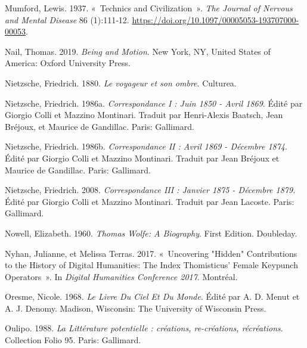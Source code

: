 \begin{CSLReferences}{1}{0}
\leavevmode{}%
Mumford, Lewis. 1937. {«~Technics and {Civilization}~»}. \emph{The
Journal of Nervous and Mental Disease} 86 (1):111‑12.
\url{https://doi.org/10.1097/00005053-193707000-00053}.

\leavevmode{}%
Nail, Thomas. 2019. \emph{Being and {Motion}}. {New York, NY, United
States of America}: {Oxford University Press}.

\leavevmode{}%
Nietzsche, Friedrich. 1880. \emph{{Le voyageur et son ombre}}.
{Culturea}.

\leavevmode{}%
Nietzsche, Friedrich. 1986a. \emph{{Correspondance I : Juin 1850 - Avril
1869}}. Édité par Giorgio Colli et Mazzino Montinari. Traduit par
Henri-Alexis Baatsch, Jean Bréjoux, et Maurice de Gandillac. {Paris}:
{Gallimard}.

\leavevmode{}%
Nietzsche, Friedrich. 1986b. \emph{{Correspondance II : Avril 1869 -
D{é}cembre 1874}}. Édité par Giorgio Colli et Mazzino Montinari. Traduit
par Jean Bréjoux et Maurice de Gandillac. {Paris}: {Gallimard}.

\leavevmode{}%
Nietzsche, Friedrich. 2008. \emph{{Correspondance III : Janvier 1875 -
D{é}cembre 1879}}. Édité par Giorgio Colli et Mazzino Montinari. Traduit
par Jean Lacoste. {Paris}: {Gallimard}.

\leavevmode{}%
Nowell, Elizabeth. 1960. \emph{Thomas {Wolfe}: {A Biography}}. First
Edition. {Doubleday}.

\leavevmode{}%
Nyhan, Julianne, et Melissa Terras. 2017. {«~Uncovering "{Hidden}"
{Contributions} to the {History} of {Digital Humanities}: {The Index
Thomisticus}' {Female Keypunch Operators}~»}. In \emph{Digital
{Humanities Conference} 2017}. {Montr{é}al}.

\leavevmode{}%
Oresme, Nicole. 1968. \emph{Le {Livre} Du Ciel Et Du Monde}. Édité par
A. D. Menut et A. J. Denomy. {Madison, Wisconsin}: {The University of
Wisconsin Press}.

\leavevmode{}%
Oulipo. 1988. \emph{{La Litt{é}rature potentielle : cr{é}ations,
re-cr{é}ations, r{é}cr{é}ations}}. {Collection Folio} 95. {Paris}:
{Gallimard}.


\end{CSLReferences}
